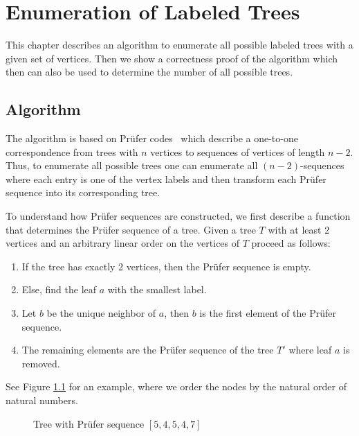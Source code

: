 \chapter{Enumeration of Labeled Trees}\label{chapter:labeled_tree_enum}

This chapter describes an algorithm to enumerate all possible labeled trees with a given set of vertices.
Then we show a correctness proof of the algorithm which then can also be used to determine the number of all possible trees.

\section{Algorithm}\label{section:labeled_tree_enum:algorithm}

The algorithm is based on Prüfer codes~\cite{pruefer:1939} which describe a one-to-one correspondence from trees with $n$ vertices to sequences of vertices of length $n-2$.
Thus, to enumerate all possible trees one can enumerate all $(n-2)$-sequences where each entry is one of the vertex labels and then transform each Prüfer sequence into its corresponding tree.

To understand how Prüfer sequences are constructed, we first describe a function that determines the Prüfer sequence of a tree.
Given a tree $T$ with at least 2 vertices and an arbitrary linear order on the vertices of $T$ proceed as follows:

\begin{enumerate}
    \item If the tree has exactly 2 vertices, then the Prüfer sequence is empty.
    \item Else, find the leaf $a$ with the smallest label.
    \item Let $b$ be the unique neighbor of $a$, then $b$ is the first element of the Prüfer sequence.
    \item The remaining elements are the Prüfer sequence of the tree $T'$ where leaf $a$ is removed.
\end{enumerate}

See Figure \ref{fig:prufer_seq_example} for an example, where we order the nodes by the natural order of natural numbers.

\begin{figure}[htbp]
    \centering
    \caption{Tree with Prüfer sequence $[5,4,5,4,7]$}
    \label{fig:prufer_seq_example}
\end{figure}

